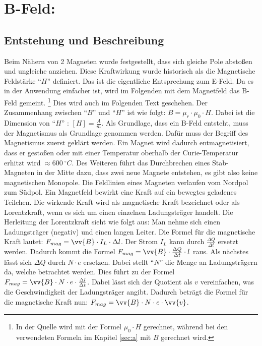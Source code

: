 \section{B-Feld:}
\subsection{Entstehung und Beschreibung}
Beim Nähern von 2 Magneten wurde festgestellt, dass sich gleiche Pole abstoßen und ungleiche anziehen.
Diese Kraftwirkung wurde historisch als die Magnetische Feldstärke "`$H$"' definiert.
Das ist die eigentliche Entsprechung zum E-Feld.
Da es in der Anwendung einfacher ist, wird im Folgenden mit dem Magnetfeld das B-Feld gemeint. \footnote{In der Quelle \cite{Gente1950} wird mit der Formel $\mu_0 \cdot H$ gerechnet, während bei den verwendeten Formeln im Kapitel \ref{sec:a} mit $B$ gerechnet wird.}
Dies wird auch im Folgenden Text geschehen.
Der Zusammenhang zwischen "`$B$"' und "`$H$"' ist wie folgt: $B = \mu_r \cdot \mu_0 \cdot H$.
Dabei ist die Dimension von "`$H$"' : $[H] = \frac{A}{m}$.
Als Grundlage, dass ein B-Feld entsteht, muss der Magnetismus als Grundlage genommen werden.
Dafür muss der Begriff des Magnetismus zuerst geklärt werden.
Ein Magnet wird dadurch entmagnetisiert, dass er gestoßen oder mit einer Temperatur oberhalb der Curie-Temperatur erhitzt wird $ \approx 600 ~ ^\circ C$.
Des Weiteren führt das Durchbrechen eines Stab-Magneten in der Mitte dazu, dass zwei neue Magnete entstehen, es gibt also keine magnetischen Monopole.
Die Feldlinien eines Magneten verlaufen vom Nordpol zum Südpol.
Ein Magnetfeld bewirkt eine Kraft auf ein bewegtes geladenes Teilchen.
Die wirkende Kraft wird als magnetische Kraft bezeichnet oder als Lorentzkraft, wenn es sich um einen einzelnen Ladungsträger handelt.
Die Herleitung der Lorentzkraft sieht wie folgt aus:
Man nehme sich einen Ladungsträger (negativ) und einen langen Leiter.
Die Formel für die magnetische Kraft lautet: $F_{mag} = \vv{B} \cdot I_L \cdot \Delta l$.
Der Strom $I_L$ kann durch $\frac{\Delta Q}{\Delta t}$ ersetzt werden.
Dadurch kommt die Formel $F_{mag} = \vv{B} \cdot \frac{\Delta Q}{\Delta t} \cdot l$ raus. 
Als nächstes lässt sich $\Delta Q$ durch $N \cdot e$ ersetzen.
Dabei stellt "`$N$"' die Menge an Ladungsträgern da, welche betrachtet werden.
Dies führt zu der Formel $F_{mag} =\vv{B} \cdot N \cdot e \cdot \frac{\Delta l}{\Delta t}$.
Dabei lässt sich der Quotient als $v$ vereinfachen, was die Geschwindigkeit der Ladungsträger angibt.
Dadurch beträgt die Formel für die magnetische Kraft nun: $F_{mag} =\vv{B} \cdot N \cdot e \cdot \vv{v} $.
